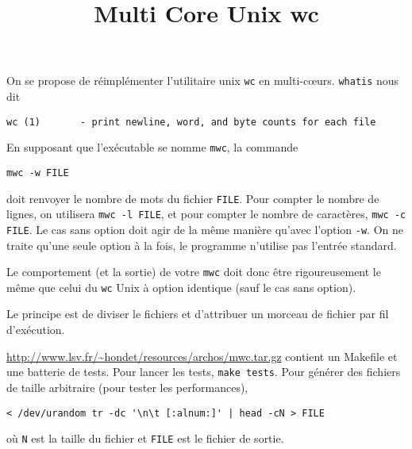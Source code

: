 \documentclass{exam}
\title{Multi Core Unix wc}
\author{}
\date{}
\begin{document}
\maketitle

On se propose de réimplémenter l'utilitaire unix \texttt{wc} en multi-c\oe{}urs.
\texttt{whatis} nous dit
\begin{verbatim}
wc (1)       - print newline, word, and byte counts for each file
\end{verbatim}

En supposant que l'exécutable se nomme \texttt{mwc}, la commande
\begin{verbatim}
mwc -w FILE
\end{verbatim}
doit renvoyer le nombre de mots du fichier \verb|FILE|. Pour compter le nombre de 
lignes, on utilisera \verb|mwc -l FILE|, et pour compter le nombre de caractères,
\verb|mwc -c FILE|. Le cas sans option doit agir de la même manière qu'avec l'option \verb|-w|. 
On ne traite qu'une seule option à la fois, le programme n'utilise pas l'entrée standard.

Le comportement (et la sortie) de votre \texttt{mwc} doit donc être
rigoureusement le même que celui du \texttt{wc} Unix à option
identique (sauf le cas sans option).

Le principe est de diviser le fichiers et d'attribuer un morceau de fichier par
fil d'exécution.

\url{http://www.lsv.fr/~hondet/resources/archos/mwc.tar.gz} contient un
Makefile et une batterie de tests. Pour lancer les tests, \texttt{make
  tests}. Pour générer des fichiers de taille arbitraire (pour tester
les performances),
\begin{verbatim}
< /dev/urandom tr -dc '\n\t [:alnum:]' | head -cN > FILE
\end{verbatim}
où \texttt{N} est la taille du fichier et \texttt{FILE} est le fichier
de sortie.
\end{document}
